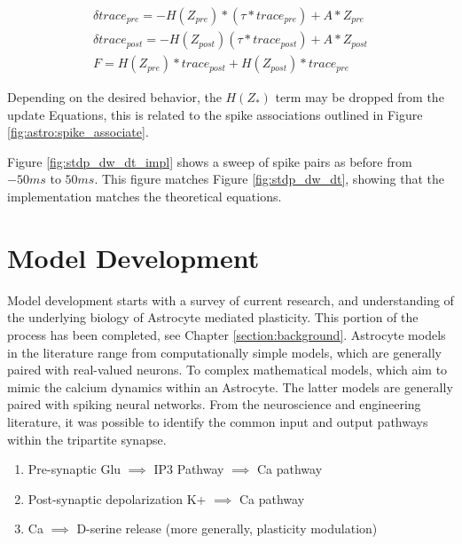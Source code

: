 
\begin{align}
  \delta trace_{pre} = -H(Z_{pre})*(\tau * trace_{pre}) +
  A*Z_{pre} \label{eq:song_impl_pre} \\ 
  \delta trace_{post} = -H(Z_{post})(\tau * trace_{post}) +
  A*Z_{post} \label{eq:song_impl_post} \\
  F = H(Z_{pre}) * trace_{post} + H(Z_{post}) *
  trace_{pre} \label{eq:song_impl_dw}
\end{align}

Depending on the desired behavior, the $H(Z_*)$ term may be dropped from the
update Equations, this is related to the spike associations outlined in Figure
\ref{fig:astro:spike_associate}.

Figure \ref{fig:stdp_dw_dt_impl} shows a sweep of spike pairs as before from
$-50ms$ to $50ms$. This figure matches Figure \ref{fig:stdp_dw_dt}, showing that
the implementation matches the theoretical equations.



\section{Model Development}
Model development starts with a survey of current research, and
understanding of the underlying biology of Astrocyte mediated
plasticity. This portion of the process has been completed, see Chapter
\ref{section:background}. Astrocyte models in the literature range from
computationally simple models, which are generally paired with real-valued
neurons. To complex mathematical models, which aim to mimic the calcium
dynamics within an Astrocyte. The latter models are generally paired with
spiking neural networks. From the neuroscience and engineering literature,
it was possible to identify the common input and output pathways within the
tripartite synapse.

\begin{enumerate}
  \item Pre-synaptic Glu $\implies$ IP3 Pathway $\implies$ Ca pathway
  \item Post-synaptic depolarization K+ $\implies$ Ca pathway
  \item Ca $\implies$ D-serine release (more generally, plasticity modulation)
\end{enumerate}

